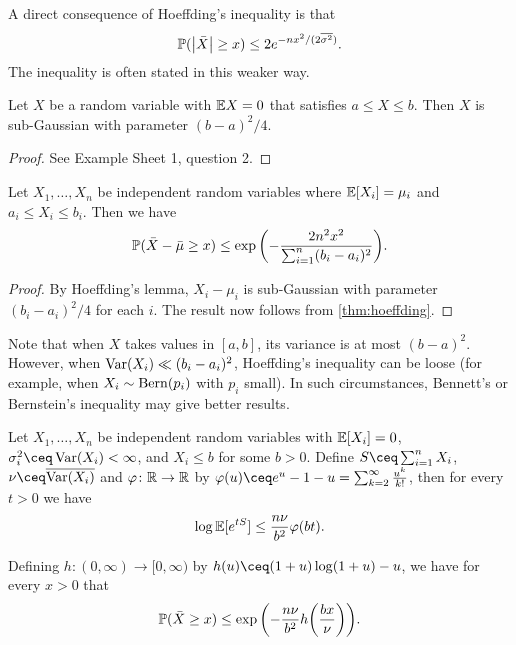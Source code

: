 \begin{remark}
	A direct consequence of Hoeffding's inequality is that
	\[
	\mathbb P(\abs{\bar X} \geq x) \leq 2 e^{-nx^2/(2\overline{\sigma^2})}.
	\]
	The inequality is often stated in this weaker way. 
\end{remark}

\begin{lemma}
	Let $X$ be a random variable with $\mathbb E X = 0$ that satisfies $a \leq X \leq b$. Then $X$ is sub-Gaussian with parameter $(b-a)^2/4$. 
\end{lemma}

\begin{proof}
	See Example Sheet 1, question 2. 
\end{proof}

\begin{corollary}
	Let $X_1, \dotsc, X_n$ be independent random variables where $\mathbb E[X_i] = \mu_i$ and $a_i \leq X_i \leq b_i$. Then we have
	\[
	\mathbb P(\bar X - \bar \mu \geq x) \leq \exp\qty(-\frac{2n^2x^2}{\sum_{i=1}^n (b_i - a_i)^2}). 
	\]
\end{corollary}

\begin{proof}
	By Hoeffding's lemma, $X_i - \mu_i$ is sub-Gaussian with parameter $(b_i - a_i)^2/4$ for each $i$. The result now follows from \cref{thm:hoeffding}.
\end{proof}

Note that when $X$ takes values in $[a, b]$, its variance is at most $(b-a)^2$. However, when $\operatorname{Var}(X_i) \ll (b_i - a_i)^2$, Hoeffding's inequality can be loose (for example, when $X_i \sim \mathrm{Bern}(p_i)$ with $p_i$ small). In such circumstances, Bennett's or Bernstein's inequality may give better results. 

\begin{theorem}
	Let $X_1, \dotsc, X_n$ be independent random variables with $\mathbb E[X_i] = 0$, $\sigma_i^2 \ceq \Var(X_i) < \infty$, and $X_i \leq b$ for some $b > 0$. Define  $S \ceq \sum_{i=1}^n X_i$, $\nu \ceq \overline{\Var(X_i)}$ and $\varphi \colon \mathbb R \to \mathbb R$ by $\phi(u) \ceq e^u - 1 - u = \sum_{k=2}^\infty \frac{u^k}{k!}$, then for every $t > 0$ we have
	\[
	\log\mathbb E[e^{tS}] \leq \frac{n \nu }{b^2} \varphi(bt). 
	\]
	
	Defining $h \colon (0, \infty) \to [0, \infty)$ by $h(u) \ceq (1+u)\log(1+u) - u$, we have for every $x > 0$ that
	\[
	\mathbb P(\bar X \geq x) \leq \exp\qty(-\frac{n \nu}{b^2} h\qty(\frac{bx}{\nu})). 
	\]
\end{theorem}

